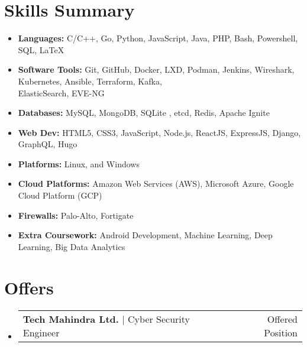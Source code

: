 \documentclass[a4paper,20pt]{article}
\makeatletter
\newcommand{\resumeItem}[2]{
  \item\small{
    \textbf{#1}{ #2 \vspace{-2pt}}
  }
}
\newcommand{\resumeSubheadingWithoutTitle}[4]{
  \vspace{-1pt}\item
    \begin{tabular*}{0.97\textwidth}{l@{\extracolsep{\fill}}r}
      #1 & #2 \\
    \end{tabular*}
}
\newcommand{\resumeSubItem}[2]{\resumeItem{#1}{#2}\vspace{-3pt}}
\newcommand{\resumeSubHeadingListStart}{\begin{itemize}[leftmargin=*]}
\newcommand{\resumeSubHeadingListEnd}{\end{itemize}}
\makeatother
\begin{document}
\section{Skills Summary}
\vspace{4pt}
	\resumeSubHeadingListStart
	\resumeSubItem{Languages:}{ \hspace{1.35cm}C/C++, Go, Python, JavaScript, Java, PHP, Bash, Powershell, SQL, \LaTeX}
	\resumeSubItem{Software Tools:}{\hspace{0.80cm}Git, GitHub, Docker, LXD, Podman, Jenkins, Wireshark, Kubernetes, Ansible, Terraform, Kafka, \\  \hspace{3.48 cm}ElasticSearch, EVE-NG}	
	\resumeSubItem{Databases:}{ \hspace{1.44cm}MySQL, MongoDB, SQLite , etcd, Redis, Apache Ignite}
	\resumeSubItem{Web Dev:}{ \hspace{1.58cm}HTML5, CSS3, JavaScript, Node.js, ReactJS, ExpressJS, Django, GraphQL, Hugo}
	\resumeSubItem{Platforms:}{ \hspace{1.49cm}Linux, and Windows}
	\resumeSubItem{Cloud Platforms:}{ \hspace{0.38cm}Amazon Web Services (AWS), Microsoft Azure, Google Cloud Platform (GCP)}
        \resumeSubItem{Firewalls:}{ \hspace{1.62cm}Palo-Alto, Fortigate}
\resumeSubItem{Extra Coursework:}{ \hspace{0.09cm}Android Development, Machine Learning, Deep Learning, Big Data Analytics}
\vspace{4pt}
\resumeSubHeadingListEnd

\section{Offers}
\vspace{4pt}

\resumeSubHeadingListStart
\resumeSubheadingWithoutTitle
    {\textbf{Tech Mahindra Ltd.} $|$ \textnormal{Cyber Security Engineer}}{Offered Position}
\vspace{4pt}  

\resumeSubHeadingListEnd
\end{document}
